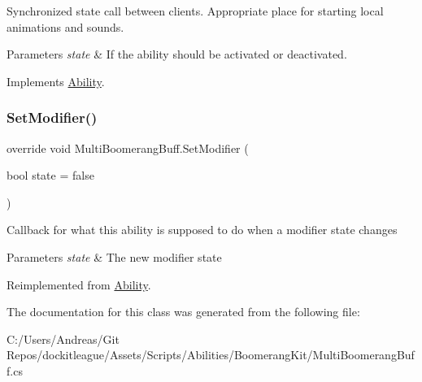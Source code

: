 Synchronized state call between clients. Appropriate place for starting local animations and sounds. 


\begin{DoxyParams}{Parameters}
{\em state} & If the ability should be activated or deactivated.\\
\hline
\end{DoxyParams}


Implements \hyperlink{class_ability_a10f7f3c2b63eeef6e352aee48d246384}{Ability}.

\hypertarget{class_multi_boomerang_buff_a0c48dc1b79b214c087a53c2114b18c50}{}\label{class_multi_boomerang_buff_a0c48dc1b79b214c087a53c2114b18c50} 
\subsubsection{\texorpdfstring{Set\+Modifier()}{SetModifier()}}
{\footnotesize\ttfamily override void Multi\+Boomerang\+Buff.\+Set\+Modifier (\begin{DoxyParamCaption}\item[{bool}]{state = {\ttfamily false} }\end{DoxyParamCaption})\hspace{0.3cm}{\ttfamily [virtual]}}



Callback for what this ability is supposed to do when a modifier state changes 


\begin{DoxyParams}{Parameters}
{\em state} & The new modifier state\\
\hline
\end{DoxyParams}


Reimplemented from \hyperlink{class_ability_a18f5361c45dc334b541892880382c098}{Ability}.



The documentation for this class was generated from the following file\+:\begin{DoxyCompactItemize}
\item 
C\+:/\+Users/\+Andreas/\+Git Repos/dockitleague/\+Assets/\+Scripts/\+Abilities/\+Boomerang\+Kit/Multi\+Boomerang\+Buff.\+cs\end{DoxyCompactItemize}
